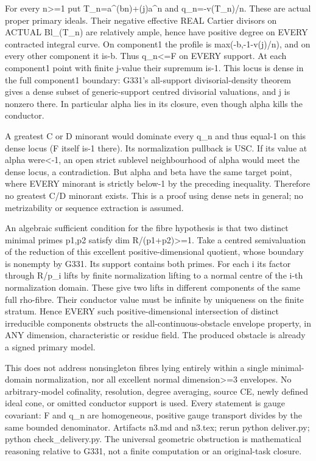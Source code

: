 For every n\textgreater{}=1 put T\_n=a\textasciicircum{}(bn)+(j)a\textasciicircum{}n and q\_n=-v(T\_n)/n. These are actual proper primary ideals. Their negative effective REAL Cartier divisors on ACTUAL Bl\_(T\_n) are relatively ample, hence have positive degree on EVERY contracted integral curve. On component1 the profile is max(-b,-1-v(j)/n), and on every other component it is-b. Thus q\_n\textless{}=F on EVERY support. At each component1 point with finite j-value their supremum is-1. This locus is dense in the full component1 boundary: G331's all-support divisorial-density theorem gives a dense subset of generic-support centred divisorial valuations, and j is nonzero there. In particular alpha lies in its closure, even though alpha kills the conductor.

A greatest C or D minorant would dominate every q\_n and thus equal-1 on this dense locus (F itself is-1 there). Its normalization pullback is USC. If its value at alpha were\textless{}-1, an open strict sublevel neighbourhood of alpha would meet the dense locus, a contradiction. But alpha and beta have the same target point, where EVERY minorant is strictly below-1 by the preceding inequality. Therefore no greatest C/D minorant exists. This is a proof using dense nets in general; no metrizability or sequence extraction is assumed.

An algebraic sufficient condition for the fibre hypothesis is that two distinct minimal primes p1,p2 satisfy dim R/(p1+p2)\textgreater{}=1. Take a centred semivaluation of the reduction of this excellent positive-dimensional quotient, whose boundary is nonempty by G331. Its support contains both primes. For each i its factor through R/p\_i lifts by finite normalization lifting to a normal centre of the i-th normalization domain. These give two lifts in different components of the same full rho-fibre. Their conductor value must be infinite by uniqueness on the finite stratum. Hence EVERY such positive-dimensional intersection of distinct irreducible components obstructs the all-continuous-obstacle envelope property, in ANY dimension, characteristic or residue field. The produced obstacle is already a signed primary model.

This does not address nonsingleton fibres lying entirely within a single minimal-domain normalization, nor all excellent normal dimension\textgreater{}=3 envelopes. No arbitrary-model cofinality, resolution, degree averaging, source CE, newly defined ideal cone, or omitted conductor support is used. Every statement is gauge covariant: F and q\_n are homogeneous, positive gauge transport divides by the same bounded denominator. Artifacts n3.md and n3.tex; rerun python deliver.py; python check\_delivery.py. The universal geometric obstruction is mathematical reasoning relative to G331, not a finite computation or an original-task closure.

